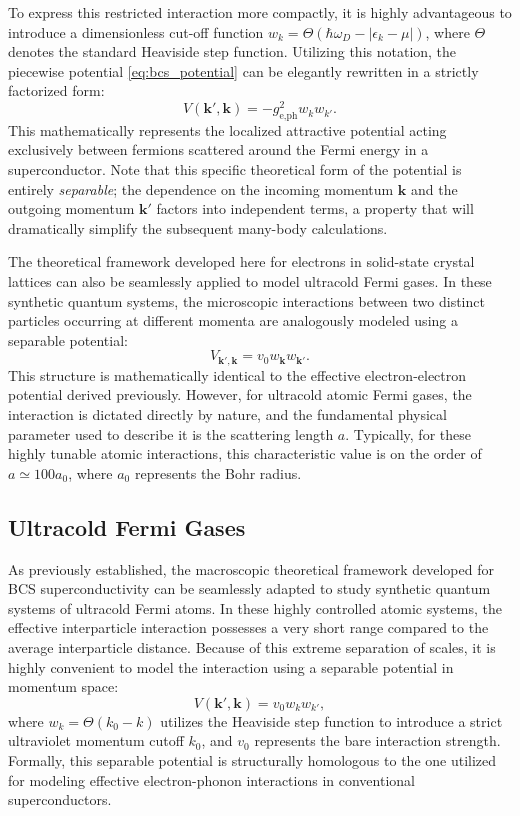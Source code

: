 To express this restricted interaction more compactly, it is highly advantageous to introduce a dimensionless cut-off function \( w_k = \Theta(\hbar\omega_D - |\epsilon_k - \mu|) \), where \( \Theta \) denotes the standard Heaviside step function. Utilizing this notation, the piecewise potential \eqref{eq:bcs_potential} can be elegantly rewritten in a strictly factorized form:
\begin{equation} \label{eq:bcs_potential_separable}
    V(\mathbf{k}', \mathbf{k}) = -g_{\text{e,ph}}^2 w_k w_{k'}.
\end{equation}
This mathematically represents the localized attractive potential acting exclusively between fermions scattered around the Fermi energy in a superconductor. Note that this specific theoretical form of the potential is entirely \emph{separable}; the dependence on the incoming momentum \( \mathbf{k} \) and the outgoing momentum \( \mathbf{k}' \) factors into independent terms, a property that will dramatically simplify the subsequent many-body calculations.

The theoretical framework developed here for electrons in solid-state crystal lattices can also be seamlessly applied to model ultracold Fermi gases. In these synthetic quantum systems, the microscopic interactions between two distinct particles occurring at different momenta are analogously modeled using a separable potential:
\[
    V_{\mathbf{k}',\mathbf{k}} = v_0 w_{\mathbf{k}} w_{\mathbf{k}'}.
\]
This structure is mathematically identical to the effective electron-electron potential derived previously. However, for ultracold atomic Fermi gases, the interaction is dictated directly by nature, and the fundamental physical parameter used to describe it is the scattering length \( a \). Typically, for these highly tunable atomic interactions, this characteristic value is on the order of \( a \simeq 100 a_0 \), where \( a_0 \) represents the Bohr radius.

\subsection{Ultracold Fermi Gases}

As previously established, the macroscopic theoretical framework developed for BCS superconductivity can be seamlessly adapted to study synthetic quantum systems of ultracold Fermi atoms. In these highly controlled atomic systems, the effective interparticle interaction possesses a very short range compared to the average interparticle distance. Because of this extreme separation of scales, it is highly convenient to model the interaction using a separable potential in momentum space:
\[
    V(\mathbf{k}', \mathbf{k}) = v_0 w_k w_{k'},
\]
where \( w_k = \Theta(k_0 - k) \) utilizes the Heaviside step function to introduce a strict ultraviolet momentum cutoff \( k_0 \), and \( v_0 \) represents the bare interaction strength. Formally, this separable potential is structurally homologous to the one utilized for modeling effective electron-phonon interactions in conventional superconductors.

